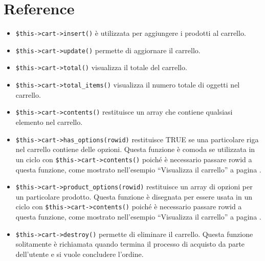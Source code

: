 \section*{Reference}
\begin{itemize}
\item \verb|$this->cart->insert()| è utilizzata per aggiungere i prodotti al carrello.

\item \verb|$this->cart->update()| permette di aggiornare il carrello.

\item \verb|$this->cart->total()| visualizza il totale del carrello.

\item \verb|$this->cart->total_items()| visualizza il numero totale di oggetti nel carrello.

\item \verb|$this->cart->contents()| restituisce un array che contiene qualsiasi elemento nel carrello.

\item \verb|$this->cart->has_options(rowid)| restituisce TRUE se una particolare riga nel carrello contiene delle opzioni. Questa funzione è comoda se utilizzata in un ciclo con \verb|$this->cart->contents()| poiché è necessario passare rowid a questa funzione, come mostrato nell'esempio ``Visualizza il carrello'' a pagina \pageref{sec:vedicarrello}.

\item \verb|$this->cart->product_options(rowid)| restituisce un array di opzioni per un particolare prodotto. Questa funzione è disegnata per essere usata in un ciclo con \verb|$this->cart->contents()| poiché è necessario passare rowid a questa funzione, come mostrato nell'esempio ``Visualizza il carrello'' a pagina \pageref{sec:vedicarrello}.

\item \verb|$this->cart->destroy()| permette di eliminare il carrello. Questa funzione solitamente è richiamata quando termina il processo di acquisto da parte dell'utente e si vuole concludere l'ordine.
\end{itemize}
